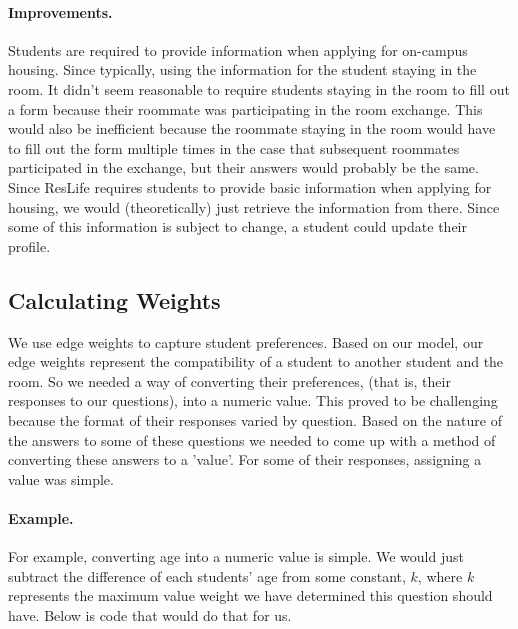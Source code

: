 \documentclass[12pt]{article}
\begin{document}
\paragraph{Improvements.}
Students are required to provide information when applying for on-campus housing. Since typically, using the information for the student staying in the room. It didn't seem reasonable to require students staying in the room to fill out a form because their roommate was participating in the room exchange. This would also be inefficient because the roommate staying in the room would have to fill out the form multiple times in the case that subsequent roommates participated in the exchange, but their answers would probably be the same. Since ResLife requires students to provide basic information when applying for housing, we would (theoretically) just retrieve the information from there. Since some of this information is subject to change, a student could update their profile. 


\subsection{Calculating Weights}
We use edge weights to capture student preferences.
Based on our model, our edge weights represent the compatibility of a student to another student and the room. So we needed a way of converting their preferences, (that is, their responses to our questions), into a numeric value. 
This proved to be challenging because the format of their responses varied by question. Based on the nature of the answers to some of these questions we needed to come up with a method of converting these answers to a 'value'. For some of their responses, assigning a value was simple.
\paragraph{Example.}
For example, converting age into a numeric value is simple. We would just subtract the difference of each students' age from some constant, $k$, where $k$ represents the maximum value weight we have determined this question should have. Below is code that would do that for us.


\end{document}
